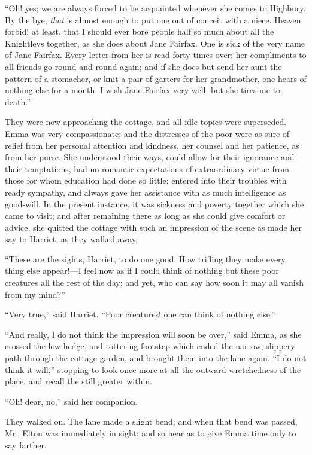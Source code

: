 ``Oh! yes; we are always forced to be acquainted whenever she comes
to Highbury.  By the bye, \emph{that} is almost enough to put one out
of conceit with a niece.  Heaven forbid! at least, that I should
ever bore people half so much about all the Knightleys together,
as she does about Jane Fairfax.  One is sick of the very name
of Jane Fairfax.  Every letter from her is read forty times over;
her compliments to all friends go round and round again; and if she
does but send her aunt the pattern of a stomacher, or knit a pair
of garters for her grandmother, one hears of nothing else for a month.
I wish Jane Fairfax very well; but she tires me to death.''

They were now approaching the cottage, and all idle topics
were superseded.  Emma was very compassionate; and the distresses
of the poor were as sure of relief from her personal attention
and kindness, her counsel and her patience, as from her purse.
She understood their ways, could allow for their ignorance and
their temptations, had no romantic expectations of extraordinary
virtue from those for whom education had done so little; entered into
their troubles with ready sympathy, and always gave her assistance
with as much intelligence as good-will.  In the present instance,
it was sickness and poverty together which she came to visit;
and after remaining there as long as she could give comfort or advice,
she quitted the cottage with such an impression of the scene
as made her say to Harriet, as they walked away,

``These are the sights, Harriet, to do one good.  How trifling they
make every thing else appear!---I feel now as if I could think of
nothing but these poor creatures all the rest of the day; and yet,
who can say how soon it may all vanish from my mind?''

``Very true,'' said Harriet.  ``Poor creatures! one can think
of nothing else.''

``And really, I do not think the impression will soon be over,''
said Emma, as she crossed the low hedge, and tottering footstep
which ended the narrow, slippery path through the cottage garden,
and brought them into the lane again.  ``I do not think it will,''
stopping to look once more at all the outward wretchedness of the place,
and recall the still greater within.

``Oh! dear, no,'' said her companion.

They walked on.  The lane made a slight bend; and when that bend
was passed, Mr.\ Elton was immediately in sight; and so near
as to give Emma time only to say farther,

